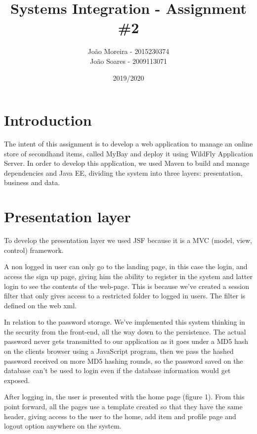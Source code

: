 \documentclass{article}
\title{Systems Integration - Assignment \#2}
\date{2019/2020}
\author{João Moreira - 2015230374 \\ 
João Soares - 2009113071 }
\begin{document}
\maketitle

\section{Introduction}

\qquad The intent of this assignment is to develop a web application to manage an online store of secondhand items, called MyBay and deploy it using WildFly Application Server. In order to develop this application, we used Maven to build and manage dependencies and \ac{Java EE}, dividing the system into three layers: presentation, business and data.

\section{Presentation layer}

\qquad To develop the presentation layer we used \ac{JSF} because it is a MVC (model, view, control) framework.

\qquad A non logged in user can only go to the landing page, in this case the login, and access the sign up page, giving him the ability to register in the system and latter login to see the contents of the web-page. This is because we've created a session filter that only gives access to a restricted folder to logged in users. The filter is defined on the web xml.

\qquad In relation to the password storage. We've implemented this system thinking in the security from the front-end, all the way down to the persistence. The actual password never gets transmitted to our application as it goes under a MD5 hash on the clients browser using a JavaScript program, then we pass the hashed password received on more MD5 hashing rounds, so the password saved on the database can't be used to login even if the database information would get exposed.

\qquad After logging in, the user is presented with the home page (figure 1). From this point forward, all the pages use a template created so that they have the same header, giving access to the user to the home, add item and profile page and logout option anywhere on the system. 
\end{document}

